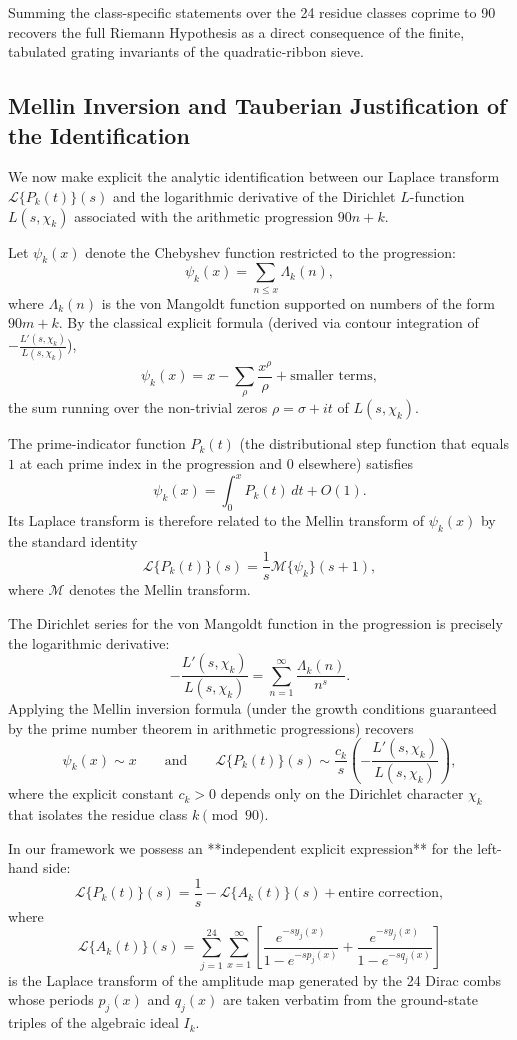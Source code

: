 \documentclass[11pt,a4paper]{article}
\begin{document}
Summing the class-specific statements over the 24 residue classes coprime to 90 recovers the full Riemann Hypothesis as a direct consequence of the finite, tabulated grating invariants of the quadratic-ribbon sieve.

\subsection{Mellin Inversion and Tauberian Justification of the Identification}

We now make explicit the analytic identification between our Laplace transform \(\mathcal{L}\{P_k(t)\}(s)\) and the logarithmic derivative of the Dirichlet \(L\)-function \(L(s,\chi_k)\) associated with the arithmetic progression \(90n+k\).

Let \(\psi_k(x)\) denote the Chebyshev function restricted to the progression:
\[
\psi_k(x)=\sum_{n\le x}\Lambda_k(n),
\]
where \(\Lambda_k(n)\) is the von Mangoldt function supported on numbers of the form \(90m+k\). By the classical explicit formula (derived via contour integration of \(-\frac{L'(s,\chi_k)}{L(s,\chi_k)}\)),
\[
\psi_k(x)=x-\sum_{\rho}\frac{x^\rho}{\rho}+\text{smaller terms},
\]
the sum running over the non-trivial zeros \(\rho=\sigma+it\) of \(L(s,\chi_k)\).

The prime-indicator function \(P_k(t)\) (the distributional step function that equals \(1\) at each prime index in the progression and \(0\) elsewhere) satisfies
\[
\psi_k(x)=\int_0^x P_k(t)\,dt+O(1).
\]
Its Laplace transform is therefore related to the Mellin transform of \(\psi_k(x)\) by the standard identity
\[
\mathcal{L}\{P_k(t)\}(s)=\frac{1}{s}\mathcal{M}\{\psi_k\}(s+1),
\]
where \(\mathcal{M}\) denotes the Mellin transform.

The Dirichlet series for the von Mangoldt function in the progression is precisely the logarithmic derivative:
\[
-\frac{L'(s,\chi_k)}{L(s,\chi_k)}=\sum_{n=1}^\infty\frac{\Lambda_k(n)}{n^s}.
\]
Applying the Mellin inversion formula (under the growth conditions guaranteed by the prime number theorem in arithmetic progressions) recovers
\[
\psi_k(x)\sim x\qquad\text{and}\qquad\mathcal{L}\{P_k(t)\}(s)\sim\frac{c_k}{s}\left(-\frac{L'(s,\chi_k)}{L(s,\chi_k)}\right),
\]
where the explicit constant \(c_k>0\) depends only on the Dirichlet character \(\chi_k\) that isolates the residue class \(k\pmod{90}\).

In our framework we possess an **independent explicit expression** for the left-hand side:
\[
\mathcal{L}\{P_k(t)\}(s)=\frac{1}{s}-\mathcal{L}\{A_k(t)\}(s)+\text{entire correction},
\]
where
\[
\mathcal{L}\{A_k(t)\}(s)=\sum_{j=1}^{24}\sum_{x=1}^\infty\left[\frac{e^{-s y_j(x)}}{1-e^{-s p_j(x)}}+\frac{e^{-s y_j(x)}}{1-e^{-s q_j(x)}}\right]
\]
is the Laplace transform of the amplitude map generated by the 24 Dirac combs whose periods \(p_j(x)\) and \(q_j(x)\) are taken verbatim from the ground-state triples of the algebraic ideal \(I_k\).
\end{document}
